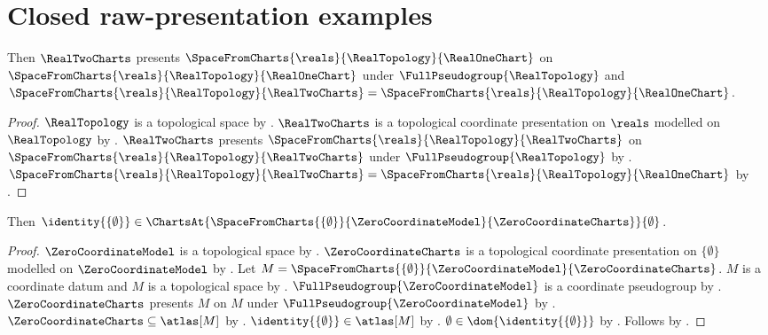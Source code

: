 \section{Closed raw-presentation examples}



\begin{theorem}\label{raw_real_presentations_consumer}
    Then $\RealTwoCharts$ presents $\SpaceFromCharts{\reals}{\RealTopology}{\RealOneChart}$
        on $\SpaceFromCharts{\reals}{\RealTopology}{\RealOneChart}$ under $\FullPseudogroup{\RealTopology}$ and
        $\SpaceFromCharts{\reals}{\RealTopology}{\RealTwoCharts}
            =\SpaceFromCharts{\reals}{\RealTopology}{\RealOneChart}$.
\end{theorem}
\begin{proof}
    $\RealTopology$ is a topological space by .
    $\RealTwoCharts$ is a topological coordinate presentation on $\reals$ modelled on $\RealTopology$ by
        .
    $\RealTwoCharts$ presents $\SpaceFromCharts{\reals}{\RealTopology}{\RealTwoCharts}$
        on $\SpaceFromCharts{\reals}{\RealTopology}{\RealTwoCharts}$ under $\FullPseudogroup{\RealTopology}$ by
        .
    $\SpaceFromCharts{\reals}{\RealTopology}{\RealTwoCharts}
        =\SpaceFromCharts{\reals}{\RealTopology}{\RealOneChart}$ by .
\end{proof}

\begin{theorem}\label{raw_zero_chart_consumer}
    Then $\identity{\{\emptyset\}}\in\ChartsAt{
        \SpaceFromCharts{\{\emptyset\}}{\ZeroCoordinateModel}{\ZeroCoordinateCharts}}{\emptyset}$.
\end{theorem}
\begin{proof}
    $\ZeroCoordinateModel$ is a topological space by .
    $\ZeroCoordinateCharts$ is a topological coordinate presentation on $\{\emptyset\}$
        modelled on $\ZeroCoordinateModel$ by .
    Let $M=\SpaceFromCharts{\{\emptyset\}}{\ZeroCoordinateModel}{\ZeroCoordinateCharts}$.
    $M$ is a coordinate datum and $M$ is a topological space by
        .
    $\FullPseudogroup{\ZeroCoordinateModel}$ is a coordinate pseudogroup by .
    $\ZeroCoordinateCharts$ presents $M$ on $M$ under $\FullPseudogroup{\ZeroCoordinateModel}$ by
        .
    $\ZeroCoordinateCharts\subseteq\atlas[M]$ by .
    $\identity{\{\emptyset\}}\in\atlas[M]$ by .
    $\emptyset\in\dom{\identity{\{\emptyset\}}}$ by .
    Follows by .
\end{proof}

